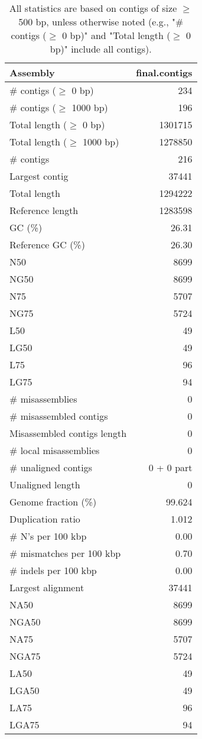 \documentclass[12pt,a4paper]{article}
\begin{document}
\begin{table}[ht]
\begin{center}
\caption{All statistics are based on contigs of size $\geq$ 500 bp, unless otherwise noted (e.g., "\# contigs ($\geq$ 0 bp)" and "Total length ($\geq$ 0 bp)" include all contigs).}
\begin{tabular}{|l*{1}{|r}|}
\hline
Assembly & final.contigs \\ \hline
\# contigs ($\geq$ 0 bp) & 234 \\ \hline
\# contigs ($\geq$ 1000 bp) & 196 \\ \hline
Total length ($\geq$ 0 bp) & 1301715 \\ \hline
Total length ($\geq$ 1000 bp) & 1278850 \\ \hline
\# contigs & 216 \\ \hline
Largest contig & 37441 \\ \hline
Total length & 1294222 \\ \hline
Reference length & 1283598 \\ \hline
GC (\%) & 26.31 \\ \hline
Reference GC (\%) & 26.30 \\ \hline
N50 & 8699 \\ \hline
NG50 & 8699 \\ \hline
N75 & 5707 \\ \hline
NG75 & 5724 \\ \hline
L50 & 49 \\ \hline
LG50 & 49 \\ \hline
L75 & 96 \\ \hline
LG75 & 94 \\ \hline
\# misassemblies & 0 \\ \hline
\# misassembled contigs & 0 \\ \hline
Misassembled contigs length & 0 \\ \hline
\# local misassemblies & 0 \\ \hline
\# unaligned contigs & 0 + 0 part \\ \hline
Unaligned length & 0 \\ \hline
Genome fraction (\%) & 99.624 \\ \hline
Duplication ratio & 1.012 \\ \hline
\# N's per 100 kbp & 0.00 \\ \hline
\# mismatches per 100 kbp & 0.70 \\ \hline
\# indels per 100 kbp & 0.00 \\ \hline
Largest alignment & 37441 \\ \hline
NA50 & 8699 \\ \hline
NGA50 & 8699 \\ \hline
NA75 & 5707 \\ \hline
NGA75 & 5724 \\ \hline
LA50 & 49 \\ \hline
LGA50 & 49 \\ \hline
LA75 & 96 \\ \hline
LGA75 & 94 \\ \hline
\end{tabular}
\end{center}
\end{table}
\end{document}
